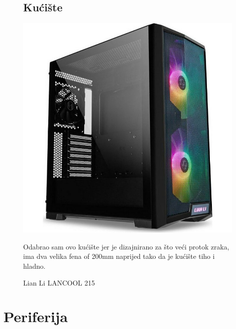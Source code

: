 \documentclass{article}
\begin{document}
\begin{figure}[H]
\subsection{Kućište}
\centering
\includegraphics[scale=0.2]{Slike/lan.jpg}
\caption{Lian Li LANCOOL 215}
Odabrao sam ovo kućište jer je dizajnirano za što veći protok zraka, ima dva velika fena of 200mm naprijed tako da je kućište tiho i hladno.
\end{figure}

\section{Periferija}
\end{document}
